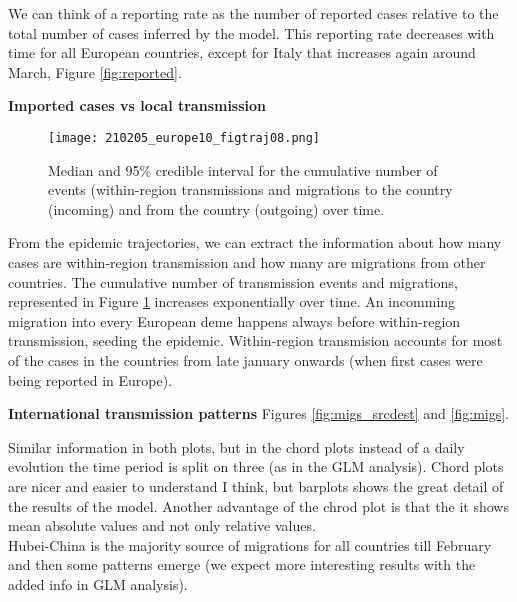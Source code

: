 We can think of a reporting rate as the number of reported cases relative to the total number of cases inferred by the model. This reporting rate decreases with time for all European countries, except for Italy that increases again around March, Figure \ref{fig:reported}. 




\textbf{Imported cases vs local transmission}

\begin{figure}[ht]
    \centering
    \texttt{[image: 210205\_europe10\_figtraj08.png]}
    \caption{Median and 95\% credible interval for the cumulative number of events (within-region transmissions and migrations to the country (incoming) and from the country (outgoing) over time.}
    \label{fig:events}
\end{figure}



From the epidemic trajectories, we can extract the information about how many cases are within-region transmission and how many are migrations from other countries. The cumulative number of transmission events and migrations, represented in Figure \ref{fig:events} increases exponentially over time. An incomming migration into every European deme happens always before within-region transmission, seeding the epidemic. Within-region transmision accounts for most of the cases in the countries from late january onwards (when first cases were being reported in Europe).




\textbf{International transmission patterns}
Figures \ref{fig:migs_srcdest} and \ref{fig:migs}.\\

Similar information in both plots, but in the chord plots instead of a daily evolution the time period is split on three (as in the GLM analysis). Chord plots are nicer and easier to understand I think, but barplots shows the great detail of the results of the model. Another advantage of the chrod plot is that the it shows mean absolute values and not only relative values.\\

Hubei-China is the majority source of migrations for all countries till February and then some patterns emerge (we expect more interesting results with the added info in GLM analysis).\\


